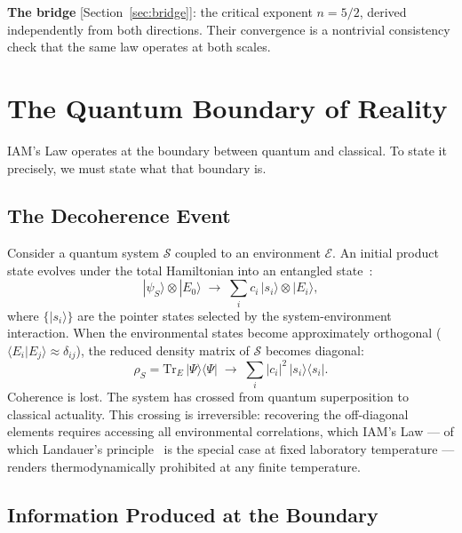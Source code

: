 \documentclass[12pt,a4paper]{article}
\begin{document}
\medskip
\noindent\textbf{The bridge} [Section~\ref{sec:bridge}]: the critical
exponent $n = 5/2$, derived independently from both directions.
Their convergence is a nontrivial consistency check that the same
law operates at both scales.

\section{The Quantum Boundary of Reality}
\label{sec:quantum}

IAM's Law operates at the boundary between quantum and classical. To
state it precisely, we must state what that boundary is.

\subsection{The Decoherence Event}

Consider a quantum system $\mathcal{S}$ coupled to an environment
$\mathcal{E}$. An initial product state evolves under the total
Hamiltonian into an entangled state~\citep{Zurek2003}:
\begin{equation}
|\psi_S\rangle \otimes |E_0\rangle \;\longrightarrow\;
\sum_i c_i\,|s_i\rangle \otimes |E_i\rangle,
\label{eq:decoherence}
\end{equation}
where $\{|s_i\rangle\}$ are the pointer states selected by the
system-environment interaction. When the environmental states become
approximately orthogonal ($\langle E_i | E_j \rangle \approx
\delta_{ij}$), the reduced density matrix of $\mathcal{S}$ becomes
diagonal:
\begin{equation}
\rho_S = \mathrm{Tr}_E\,|\Psi\rangle\langle\Psi|
\;\longrightarrow\; \sum_i |c_i|^2\,|s_i\rangle\langle s_i|.
\label{eq:rho_diagonal}
\end{equation}
Coherence is lost. The system has crossed from quantum superposition
to classical actuality. This crossing is irreversible: recovering the
off-diagonal elements requires accessing all environmental correlations,
which IAM's Law --- of which Landauer's principle~\citep{Landauer1961}
is the special case at fixed laboratory temperature ---
renders thermodynamically prohibited at any finite temperature.

\subsection{Information Produced at the Boundary}
\end{document}
